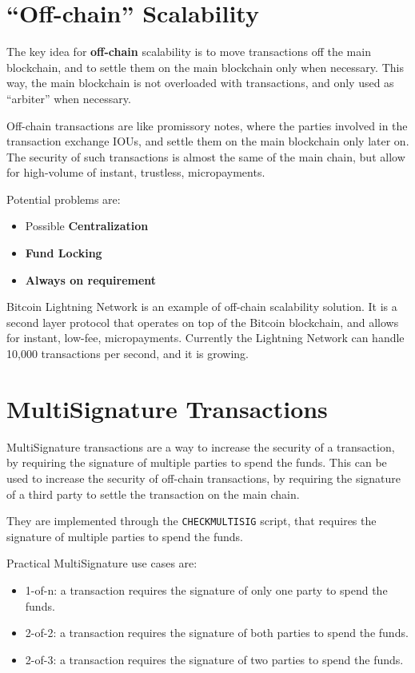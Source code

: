 \section{``Off-chain'' Scalability}
The key idea for \textbf{off-chain} scalability is to move transactions off the main blockchain, and to settle them on the main blockchain only when necessary. This way, the main blockchain is not overloaded with transactions, and only used as ``arbiter'' when necessary.

Off-chain transactions are like promissory notes, where the parties involved in the transaction exchange IOUs, and settle them on the main blockchain only later on.
The security of such transactions is almost the same of the main chain, but allow for high-volume of instant, trustless, micropayments.

Potential problems are:
\begin{itemize}
   \item Possible \textbf{Centralization}
   \item \textbf{Fund Locking}
   \item \textbf{Always on requirement}
\end{itemize}

Bitcoin Lightning Network is an example of off-chain scalability solution. It is a second layer protocol that operates on top of the Bitcoin blockchain, and allows for instant, low-fee, micropayments.
Currently the Lightning Network can handle 10,000 transactions per second, and it is growing.

\section{MultiSignature Transactions}
MultiSignature transactions are a way to increase the security of a transaction, by requiring the signature of multiple parties to spend the funds. This can be used to increase the security of off-chain transactions, by requiring the signature of a third party to settle the transaction on the main chain.

They are implemented through the \texttt{CHECKMULTISIG} script, that requires the signature of multiple parties to spend the funds.

Practical MultiSignature use cases are:
\begin{itemize}
   \item 1-of-n: a transaction requires the signature of only one party to spend the funds.
   \item 2-of-2: a transaction requires the signature of both parties to spend the funds.
   \item 2-of-3: a transaction requires the signature of two parties to spend the funds.
\end{itemize}

